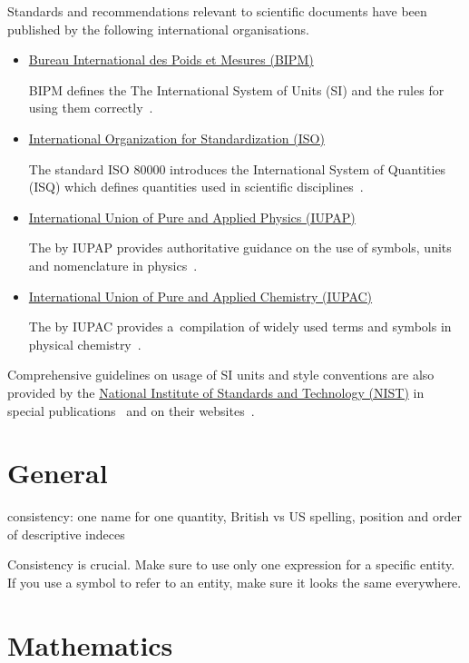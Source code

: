 \documentclass[12pt,a4paper]{article}
\begin{document}
Standards and recommendations relevant to scientific documents have been published by the following international organisations.
\begin{itemize}
\item \href{https://www.bipm.org}{Bureau International des Poids et Mesures (BIPM)}

BIPM defines the The International System of Units (SI) and the rules for using them correctly~\cite{bipm-si-brochure}.

\item \href{https://www.iso.org}{International Organization for Standardization (ISO)}

The standard ISO 80000 introduces the International System of Quantities (ISQ) which defines quantities used in scientific disciplines~\cite{iso-80000-1}.

\item \href{http://iupap.org}{International Union of Pure and Applied Physics (IUPAP)}

The  by IUPAP provides authoritative guidance on the use of symbols, units and nomenclature in physics~\cite{iupap-red-book}.

\item \href{https://iupac.org}{International Union of Pure and Applied Chemistry (IUPAC)}

The  by IUPAC provides a~compilation of widely used terms and symbols in physical chemistry~\cite{iupac-green-book}.
\end{itemize}
Comprehensive guidelines on usage of SI units and style conventions are also provided by the \href{https://www.nist.gov}{National Institute of Standards and Technology (NIST)} in special publications~\cite{nist-si,nist-si-guide} and on their websites~\cite{nist-units}.


\section{General}

consistency: one name for one quantity, British vs US spelling, position and order of descriptive indeces

Consistency is crucial.
Make sure to use only one expression for a specific entity.
If you use a symbol to refer to an entity, make sure it looks the same everywhere.

\section{Mathematics}
\end{document}
